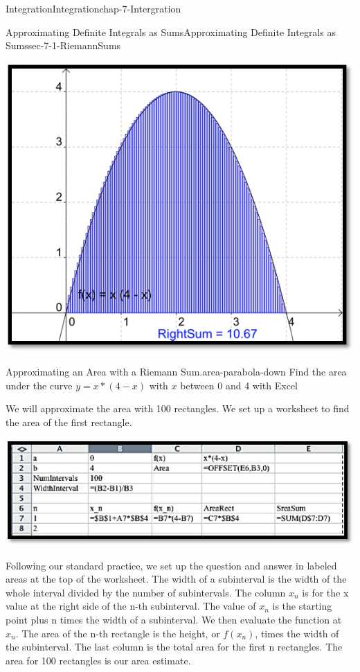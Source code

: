 \documentclass[oneside,10pt,]{book}
\numberwithin{equation}{section}
\begin{document}
\begin{chapterptx}{Integration}{}{Integration}{}{}{chap-7-Intergration}
\begin{sectionptx}{Approximating Definite Integrals as Sums}{}{Approximating Definite Integrals as Sums}{}{}{sec-7-1-RiemannSums}
\begin{sidebyside}{1}{0.2}{0.2}{0}
\begin{sbspanel}{0.6}
\includegraphics[width=1\linewidth]{images/sec7-1-8.png}
\end{sbspanel}%
\end{sidebyside}%
\begin{example}{Approximating an Area with a Riemann Sum.}{area-parabola-down}%
\hypertarget{p-2556}{}%
Find the area under the curve \(y=x*(4-x)\) with \(x\) between 0 and 4 with Excel%
\par
\hypertarget{p-2557}{}%
We will approximate the area with 100 rectangles.  We set up a worksheet to find the area of the first rectangle.%
\begin{sidebyside}{1}{0.15}{0.15}{0}%
\begin{sbspanel}{0.7}%
\includegraphics[width=1\linewidth]{images/sec7-1-9.png}
\end{sbspanel}%
\end{sidebyside}%
\par
\hypertarget{p-2558}{}%
Following our standard practice, we set up the question and answer in labeled areas at the top of the worksheet.  The width of a subinterval is the width of the whole interval divided by the number of subintervals.  The column \(x_n\) is for the x value at the right side of the n-th subinterval.   The value of \(x_n\) is the starting point plus n times the width of a subinterval.  We then evaluate the function at \(x_n\).  The area of the n-th rectangle is the height, or \(f(x_n)\), times the width of the subinterval.  The last column is the total area for the first n rectangles.  The area for 100 rectangles is our area estimate.%

\end{example}
\end{sectionptx}
\end{chapterptx}
\end{document}
